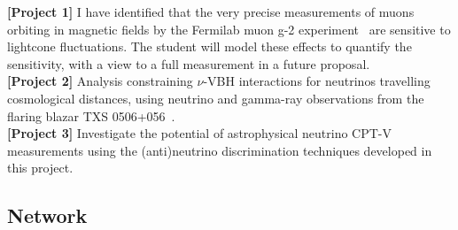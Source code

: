 \documentclass[a4paper,11pt]{article}
\begin{document}
\noindent \textbf{[Project 1]} I have identified that the very precise measurements of muons orbiting in magnetic fields by the Fermilab muon g-2 experiment~\cite{Grange:2015fou} are sensitive to lightcone fluctuations. The student will model these effects to quantify the sensitivity, with a view to a full measurement in a future proposal.\\
\noindent \textbf{[Project 2]} Analysis constraining $\nu$-VBH interactions for neutrinos travelling cosmological distances, using neutrino and gamma-ray observations from the flaring blazar TXS 0506+056~\cite{eaat1378}.\\
\noindent \textbf{[Project 3]} Investigate the potential of astrophysical neutrino CPT-V measurements using the (anti)neutrino discrimination techniques developed in this project.

\subsection{Network}




\end{document}
